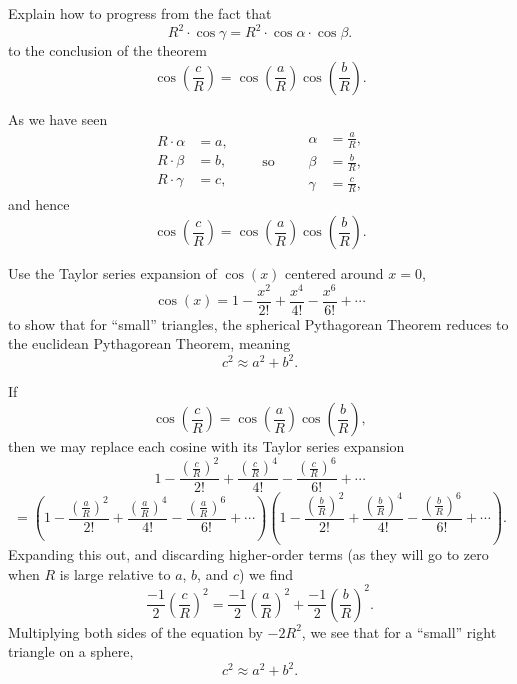 \documentclass{ximera}
\begin{document}
\begin{problem}
  Explain how to progress from the fact that
  \[
  R^2\cdot \cos \gamma = R^2 \cdot \cos\alpha \cdot \cos\beta.
  \]
  to the conclusion of the theorem
  \[
  \cos\left(\frac{c}{R}\right)=\cos\left(\frac{a}{R}\right)\cos\left(\frac{b}{R}\right).
  \]
  \begin{freeResponse}
    As we have seen
    \[
    \begin{split}
      R\cdot \alpha &= a,\\
      R\cdot \beta  &= b,\\
      R\cdot \gamma &= c,
    \end{split}
    \qquad\text{so}\qquad
    \begin{split}
      \alpha &= \frac{a}{R},\\
      \beta  &= \frac{b}{R},\\
      \gamma &= \frac{c}{R},
    \end{split}
    \]
    and hence
    \[
    \cos\left(\frac{c}{R}\right)=\cos\left(\frac{a}{R}\right)\cos\left(\frac{b}{R}\right).
    \]
  \end{freeResponse}
\end{problem}


\begin{problem}
  Use the Taylor series expansion of $\cos(x)$ centered around $x=0$,
  \[
  \cos(x) = 1 - \frac{x^2}{2!} + \frac{x^4}{4!} - \frac{x^6}{6!} + \cdots
  \]
to show that for ``small'' triangles, the spherical Pythagorean
Theorem reduces to the euclidean Pythagorean Theorem, meaning
\[
c^2 \approx a^2+b^2.
\]
\begin{freeResponse}
  If
  \[
  \cos\left(\frac{c}{R}\right)=\cos\left(\frac{a}{R}\right)\cos\left(\frac{b}{R}\right),
  \]
  then we may replace each cosine with its Taylor series expansion
  \[
  1 - \frac{\left(\frac{c}{R}\right)^2}{2!} + \frac{\left(\frac{c}{R}\right)^4}{4!} - \frac{\left(\frac{c}{R}\right)^6}{6!} + \cdots
  \]
  \[
  =\left(
  1 - \frac{\left(\frac{a}{R}\right)^2}{2!} + \frac{\left(\frac{a}{R}\right)^4}{4!} - \frac{\left(\frac{a}{R}\right)^6}{6!} + \cdots
  \right)
  \left(
  1 - \frac{\left(\frac{b}{R}\right)^2}{2!} + \frac{\left(\frac{b}{R}\right)^4}{4!} - \frac{\left(\frac{b}{R}\right)^6}{6!} + \cdots
  \right).
  \]
  Expanding this out, and discarding higher-order terms (as they will
  go to zero when $R$ is large relative to $a$, $b$, and $c$) we find
  \[
  \frac{-1}{2}\left(\frac{c}{R}\right)^2 = \frac{-1}{2}\left(\frac{a}{R}\right)^2+\frac{-1}{2}\left(\frac{b}{R}\right)^2.
  \]
  Multiplying both sides of the equation by $-2R^2$, we see that for a
  ``small'' right triangle on a sphere,
  \[
  c^2 \approx a^2 +b^2.
  \]
\end{freeResponse}
\end{problem}
\end{document}
